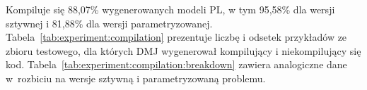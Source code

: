 



Kompiluje się 88,07\% wygenerowanych modeli PL, w tym 95,58\% dla wersji sztywnej i 81,88\% dla wersji parametryzowanej. Tabela~\ref{tab:experiment:compilation} prezentuje liczbę i odsetek przykładów ze zbioru testowego, dla których DMJ wygenerował kompilujący i niekompilujący się kod. Tabela~\ref{tab:experiment:compilation:breakdown} zawiera analogiczne dane w~rozbiciu na wersje sztywną i parametryzowaną problemu.

